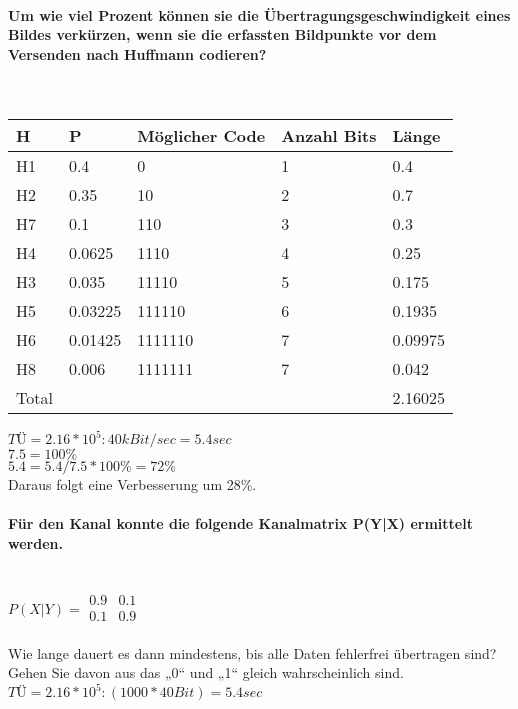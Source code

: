 \paragraph{Um wie viel Prozent können sie die Übertragungsgeschwindigkeit eines Bildes verkürzen, wenn sie die erfassten Bildpunkte vor dem Versenden nach Huffmann codieren?}\mbox{}\\
\begin{center}
    \centering
    \begin{tabular}{p{1cm} | p{1cm} | p{1cm} | p{1cm} | p{1cm}}
        \bfseries{H} & \bfseries{P} & \bfseries{Möglicher Code} & \bfseries{Anzahl Bits} & \bfseries{Länge}\\ \hline
        H1 & 0.4 & 0 & 1 & 0.4\\ 
        H2 & 0.35 & 10 & 2 & 0.7\\
        H7 & 0.1 & 110 & 3 & 0.3\\
        H4 & 0.0625 & 1110 & 4 & 0.25\\
        H3 & 0.035 & 11110 & 5 & 0.175\\
        H5 & 0.03225 & 111110 & 6 & 0.1935\\
        H6 & 0.01425 & 1111110 & 7 & 0.09975\\
        H8 & 0.006 & 1111111 & 7 & 0.042\\
        Total & & & & 2.16025
    \end{tabular}
\end{center}

$TÜ=2.16*10^5:40kBit/sec = 5.4sec$\\
$7.5=100\%$\\
$5.4 = 5.4/7.5*100\% = 72\%$\\
Daraus folgt eine Verbesserung um 28\%.

\paragraph{Für den Kanal konnte die folgende Kanalmatrix P(Y|X) ermittelt werden.}\mbox{}\\
$P(X|Y) = \begin{matrix}
    0.9 & 0.1\\
    0.1 & 0.9\\
\end{matrix}$

Wie lange dauert es dann mindestens, bis alle Daten fehlerfrei übertragen sind? Gehen Sie davon aus das „0“ und  „1“ gleich wahrscheinlich sind. \\
$TÜ = 2.16*10^5:(1000*40Bit)=5.4sec$


